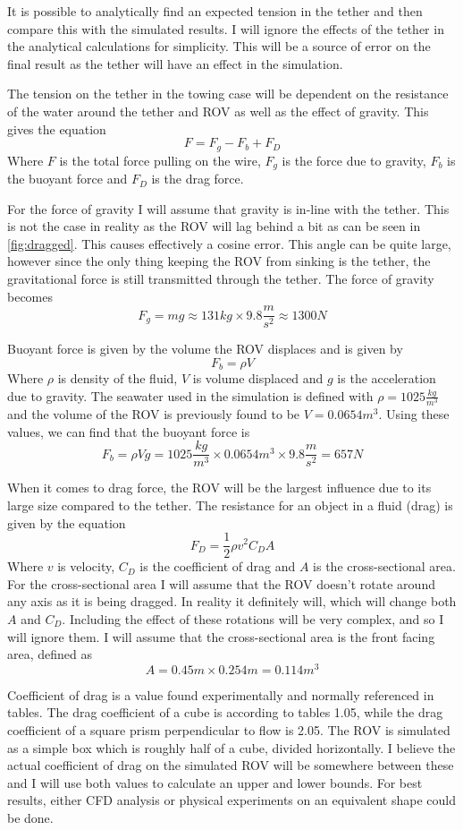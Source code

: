 It is possible to analytically find an expected tension in the tether and then compare this with the simulated results. I will ignore the effects of the tether in the analytical calculations for simplicity. This will be a source of error on the final result as the tether will have an effect in the simulation.

The tension on the tether in the towing case will be dependent on the resistance of the water around the tether and ROV as well as the effect of gravity. This gives the equation 
\[F = F_g - F_b + F_D\]
Where \(F\) is the total force pulling on the wire, \(F_g\) is the force due to gravity, \(F_b\) is the buoyant force and \(F_D\) is the drag force. 

For the force of gravity I will assume that gravity is in-line with the tether. This is not the case in reality as the ROV will lag behind a bit as can be seen in \cref{fig:dragged}. This causes effectively a cosine error. This angle can be quite large, however since the only thing keeping the ROV from sinking is the tether, the gravitational force is still transmitted through the tether. The force of gravity becomes
\[F_g = m g \approx 131kg \times 9.8\frac{m}{s^2} \approx 1300N\] 

Buoyant force is given by the volume the ROV displaces and is given by 
\[F_b = \rho V\]
Where \(\rho\) is density of the fluid, \(V\) is volume displaced and \(g\) is the acceleration due to gravity. The seawater used in the simulation is defined with \(\rho = 1025\frac{kg}{m^3}\) and the volume of the ROV is previously found to be \(V=0.0654m^3\). Using these values, we can find that the buoyant force is 
\[F_b = \rho V g = 1025\frac{kg}{m^3} \times 0.0654m^3 \times 9.8\frac{m}{s^2} = 657N\]

When it comes to drag force, the ROV will be the largest influence due to its large size compared to the tether. The resistance for an object in a fluid (drag) is given by the equation 
\[F_D = \frac 1 2 \rho v^2 C_D A\]
Where \(v\) is velocity, \(C_D\) is the coefficient of drag and \(A\) is the cross-sectional area. For the cross-sectional area I will assume that the ROV doesn't rotate around any axis as it is being dragged. In reality it definitely will, which will change both \(A\) and \(C_D\). Including the effect of these rotations will be very complex, and so I will ignore them. I will assume that the cross-sectional area is the front facing area, defined as \[A = 0.45m\times 0.254m = 0.114m^3\]

Coefficient of drag is a value found experimentally and normally referenced in tables. The drag coefficient of a cube is according to tables 1.05, while the drag coefficient of a square prism perpendicular to flow is 2.05. The ROV is simulated as a simple box which is roughly half of a cube, divided horizontally. I believe the actual coefficient of drag on the simulated ROV will be somewhere between these and I will use both values to calculate an upper and lower bounds. For best results, either CFD analysis  or physical experiments on an equivalent shape could be done.

